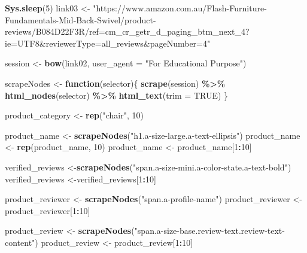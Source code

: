 \documentclass[
]{article}
\newenvironment{Shaded}{\begin{snugshade}}{\end{snugshade}}
\newcommand{\AttributeTok}[1]{\textcolor[rgb]{0.13,0.29,0.53}{#1}}
\newcommand{\ConstantTok}[1]{\textcolor[rgb]{0.56,0.35,0.01}{#1}}
\newcommand{\ControlFlowTok}[1]{\textcolor[rgb]{0.13,0.29,0.53}{\textbf{#1}}}
\newcommand{\DecValTok}[1]{\textcolor[rgb]{0.00,0.00,0.81}{#1}}
\newcommand{\FunctionTok}[1]{\textcolor[rgb]{0.13,0.29,0.53}{\textbf{#1}}}
\newcommand{\NormalTok}[1]{#1}
\newcommand{\OtherTok}[1]{\textcolor[rgb]{0.56,0.35,0.01}{#1}}
\newcommand{\SpecialCharTok}[1]{\textcolor[rgb]{0.81,0.36,0.00}{\textbf{#1}}}
\newcommand{\StringTok}[1]{\textcolor[rgb]{0.31,0.60,0.02}{#1}}
\begin{document}
\begin{Shaded}
\begin{Highlighting}[]
  \FunctionTok{Sys.sleep}\NormalTok{(}\DecValTok{5}\NormalTok{)}
\NormalTok{link03 }\OtherTok{\textless{}{-}} \StringTok{"https://www.amazon.com.au/Flash{-}Furniture{-}Fundamentals{-}Mid{-}Back{-}Swivel/product{-}reviews/B084D22F3R/ref=cm\_cr\_getr\_d\_paging\_btm\_next\_4?ie=UTF8\&reviewerType=all\_reviews\&pageNumber=4"}


\NormalTok{  session }\OtherTok{\textless{}{-}} \FunctionTok{bow}\NormalTok{(link02,}
               \AttributeTok{user\_agent =} \StringTok{"For Educational Purpose"}\NormalTok{)}

\NormalTok{  scrapeNodes }\OtherTok{\textless{}{-}} \ControlFlowTok{function}\NormalTok{(selector)\{}
    \FunctionTok{scrape}\NormalTok{(session) }\SpecialCharTok{\%\textgreater{}\%}
      \FunctionTok{html\_nodes}\NormalTok{(selector) }\SpecialCharTok{\%\textgreater{}\%}
      \FunctionTok{html\_text}\NormalTok{(}\AttributeTok{trim =} \ConstantTok{TRUE}\NormalTok{)}
\NormalTok{  \}}

\NormalTok{  product\_category }\OtherTok{\textless{}{-}} \FunctionTok{rep}\NormalTok{(}\StringTok{"chair"}\NormalTok{, }\DecValTok{10}\NormalTok{)}

\NormalTok{  product\_name }\OtherTok{\textless{}{-}} \FunctionTok{scrapeNodes}\NormalTok{(}\StringTok{"h1.a{-}size{-}large.a{-}text{-}ellipsis"}\NormalTok{)}
\NormalTok{  product\_name }\OtherTok{\textless{}{-}} \FunctionTok{rep}\NormalTok{(product\_name, }\DecValTok{10}\NormalTok{)}
\NormalTok{  product\_name }\OtherTok{\textless{}{-}}\NormalTok{ product\_name[}\DecValTok{1}\SpecialCharTok{:}\DecValTok{10}\NormalTok{]}
  
\NormalTok{  verified\_reviews }\OtherTok{\textless{}{-}}\FunctionTok{scrapeNodes}\NormalTok{(}\StringTok{"span.a{-}size{-}mini.a{-}color{-}state.a{-}text{-}bold"}\NormalTok{)}
\NormalTok{  verified\_reviews }\OtherTok{\textless{}{-}}\NormalTok{verified\_reviews[}\DecValTok{1}\SpecialCharTok{:}\DecValTok{10}\NormalTok{]}
  
\NormalTok{  product\_reviewer }\OtherTok{\textless{}{-}} \FunctionTok{scrapeNodes}\NormalTok{(}\StringTok{"span.a{-}profile{-}name"}\NormalTok{)}
\NormalTok{  product\_reviewer }\OtherTok{\textless{}{-}}\NormalTok{ product\_reviewer[}\DecValTok{1}\SpecialCharTok{:}\DecValTok{10}\NormalTok{]}
  
\NormalTok{  product\_review }\OtherTok{\textless{}{-}} \FunctionTok{scrapeNodes}\NormalTok{(}\StringTok{"span.a{-}size{-}base.review{-}text.review{-}text{-}content"}\NormalTok{)}
\NormalTok{  product\_review }\OtherTok{\textless{}{-}}\NormalTok{ product\_review[}\DecValTok{1}\SpecialCharTok{:}\DecValTok{10}\NormalTok{]}
  

\end{Highlighting}
\end{Shaded}
\end{document}
